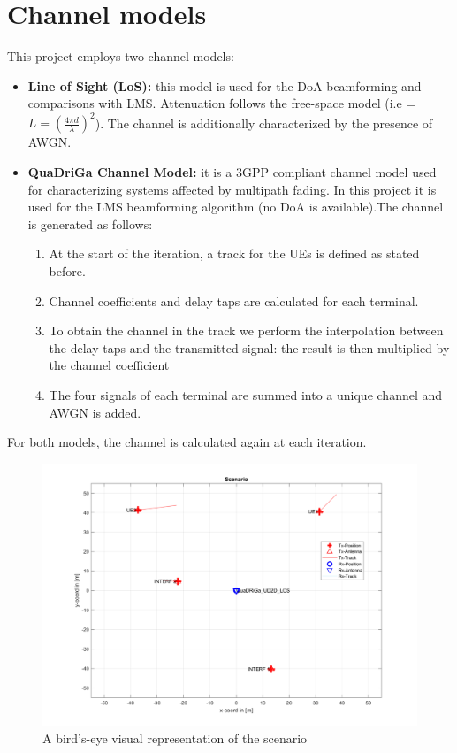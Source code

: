 \documentclass[a4paper,10pt]{article}
\begin{document}
\section{Channel models}
This project employs two channel models:
\begin{itemize}
	\item \textbf{Line of Sight (LoS):} this model is used for the DoA beamforming and comparisons with LMS. Attenuation follows the free-space model (i.e = $ \displaystyle L= \left( \frac{4\pi d}{\lambda} \right)^2$). The channel is additionally characterized by the presence of AWGN.
	\item \textbf{QuaDriGa Channel Model:} it is a 3GPP compliant channel model used for characterizing systems affected by multipath fading. In this project it is used for the LMS beamforming algorithm (no DoA is available).The channel is generated as follows:
	\begin{enumerate}
		\item At the start of the iteration, a track for the UEs is defined as stated before.
		\item Channel coefficients and delay taps are calculated for each terminal.
		\item To obtain the channel in the track we perform the interpolation between the delay taps and the transmitted signal: the result is then multiplied by the channel coefficient
		\item The four signals of each terminal are summed into a unique channel and AWGN is added.
		
	\end{enumerate}
\end{itemize}

For both models, the channel is calculated again at each iteration. \\
\begin{figure}
	\centering
	\includegraphics[width=0.8\linewidth]{scenario.pdf}
	\caption{\label{fig:scenario}A bird's-eye visual representation of the scenario}
\end{figure}
\end{document}
